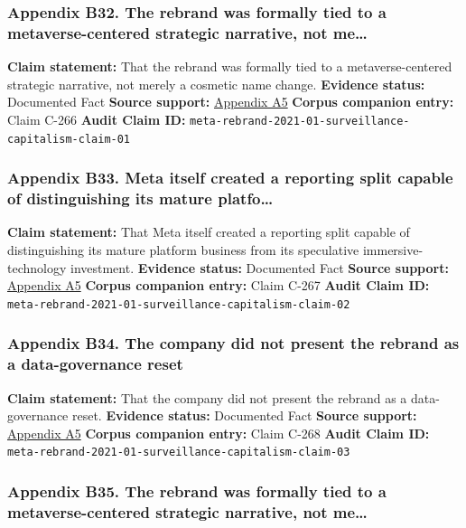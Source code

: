 \documentclass[
  american,
  11pt,
  letterpaper,
]{article}
\begin{document}
\subsubsection{Appendix B32. The rebrand was formally tied to a
metaverse-centered strategic narrative, not
me\ldots{}}\label{appendix-b32-the-rebrand-was-formally-tied-to-a-metaverse-centered-strategic-narrative-not-me}

\textbf{Claim statement:} That the rebrand was formally tied to a
metaverse-centered strategic narrative, not merely a cosmetic name
change. \textbf{Evidence status:} Documented Fact \textbf{Source
support:}
\hyperref[appendix-a5-the-facebook-company-is-now-meta]{Appendix A5}
\textbf{Corpus companion entry:} Claim C-266 \textbf{Audit Claim ID:}
\texttt{meta-rebrand-2021-01-surveillance-capitalism-claim-01}

\subsubsection{Appendix B33. Meta itself created a reporting split
capable of distinguishing its mature
platfo\ldots{}}\label{appendix-b33-meta-itself-created-a-reporting-split-capable-of-distinguishing-its-mature-platfo}

\textbf{Claim statement:} That Meta itself created a reporting split
capable of distinguishing its mature platform business from its
speculative immersive-technology investment. \textbf{Evidence status:}
Documented Fact \textbf{Source support:}
\hyperref[appendix-a5-the-facebook-company-is-now-meta]{Appendix A5}
\textbf{Corpus companion entry:} Claim C-267 \textbf{Audit Claim ID:}
\texttt{meta-rebrand-2021-01-surveillance-capitalism-claim-02}

\subsubsection{Appendix B34. The company did not present the rebrand as
a data-governance
reset}\label{appendix-b34-the-company-did-not-present-the-rebrand-as-a-data-governance-reset}

\textbf{Claim statement:} That the company did not present the rebrand
as a data-governance reset. \textbf{Evidence status:} Documented Fact
\textbf{Source support:}
\hyperref[appendix-a5-the-facebook-company-is-now-meta]{Appendix A5}
\textbf{Corpus companion entry:} Claim C-268 \textbf{Audit Claim ID:}
\texttt{meta-rebrand-2021-01-surveillance-capitalism-claim-03}

\subsubsection{Appendix B35. The rebrand was formally tied to a
metaverse-centered strategic narrative, not
me\ldots{}}\label{appendix-b35-the-rebrand-was-formally-tied-to-a-metaverse-centered-strategic-narrative-not-me}
\end{document}

